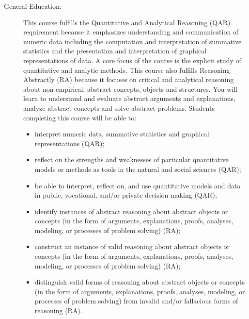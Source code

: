 \documentclass[
  twoside]{article}
\begin{document}
\begin{description}
\item[General Education: ]
This course fulfills the Quantitative and Analytical Reasoning (QAR) requirement because it emphasizes understanding and communication of numeric data including the computation and interpretation of summative statistics and the presentation and interpretation of graphical representations of data. A core focus of the course is the explicit study of quantitative and analytic methods. This course also fulfills Reasoning Abstractly (RA) because it focuses on critical and analytical reasoning about non-empirical, abstract concepts, objects and structures. You will learn to understand and evaluate abstract arguments and explanations, analyze abstract concepts and solve abstract problems.  Students completing this course will be able to:
\begin{itemize}[noitemsep]
    \item interpret numeric data, summative statistics and graphical representations (QAR);
    \item reflect on the strengths and weaknesses of particular quantitative models or methods as tools in the natural and social sciences (QAR);
    \item be able to interpret, reflect on, and use quantitative models and data in public, vocational, and/or private decision making (QAR);
    \item identify instances of abstract reasoning about abstract objects or concepts (in the form of arguments, explanations, proofs, analyses, modeling, or processes of problem solving) (RA);
    \item construct an instance of valid reasoning about abstract objects or concepts (in the form of arguments, explanations, proofs, analyses, modeling, or processes of problem solving) (RA);
    \item distinguish valid forms of reasoning about abstract objects or concepts (in the form of arguments, explanations, proofs, analyses, modeling, or processes of problem solving) from invalid and/or fallacious
forms of reasoning (RA).
\end{itemize}


\end{description}
\end{document}
